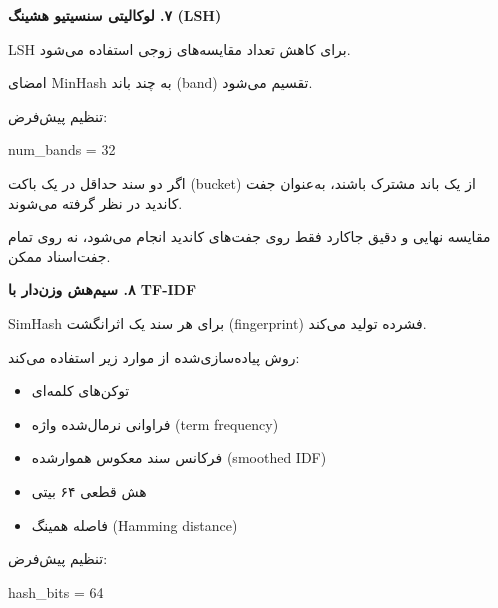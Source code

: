 \documentclass[11pt]{article}
\begin{document}
\medskip\noindent\hrulefill\medskip

\medskip
{\large\bfseries ‏۷. لوکالیتی سنسیتیو هشینگ (LSH)}\medskip


\noindent ‏LSH برای کاهش تعداد مقایسه‌های زوجی استفاده می‌شود.\par

\noindent ‏امضای MinHash به چند باند (band) تقسیم می‌شود.\par

\noindent ‏تنظیم پیش‌فرض:\par

{\mycode
\begin{flushleft}
num\_bands = 32
\end{flushleft}}

\noindent ‏اگر دو سند حداقل در یک باکت (bucket) از یک باند مشترک باشند، به‌عنوان جفت کاندید در نظر گرفته می‌شوند.\par

\noindent ‏مقایسه نهایی و دقیق جاکارد فقط روی جفت‌های کاندید انجام می‌شود، نه روی تمام جفت‌اسناد ممکن.\par

\medskip\noindent\hrulefill\medskip

\medskip
{\large\bfseries ‏۸. سیم‌هش وزن‌دار با TF-IDF}\medskip


\noindent ‏SimHash برای هر سند یک اثرانگشت (fingerprint) فشرده تولید می‌کند.\par

\noindent ‏روش پیاده‌سازی‌شده از موارد زیر استفاده می‌کند:\par

\begin{itemize}

\item ‏توکن‌های کلمه‌ای

\item ‏فراوانی نرمال‌شده واژه (term frequency)

\item ‏فرکانس سند معکوس هموارشده (smoothed IDF)

\item ‏هش قطعی ۶۴ بیتی

\item ‏فاصله همینگ (Hamming distance)

\end{itemize}

\noindent ‏تنظیم پیش‌فرض:\par

{\mycode
\begin{flushleft}
hash\_bits = 64
\end{flushleft}}
\end{document}
